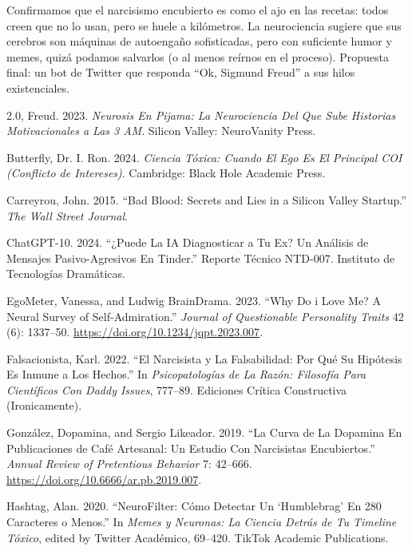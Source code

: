 \documentclass[
]{article}
\newlength{\cslhangindent}
\newenvironment{CSLReferences}[2] %
 {\begin{list}{}{%
  \setlength{\itemindent}{0pt}
  \setlength{\leftmargin}{0pt}
  \setlength{\parsep}{0pt}
  \ifodd #1
   \setlength{\leftmargin}{\cslhangindent}
   \setlength{\itemindent}{-1\cslhangindent}
  \fi
  \setlength{\itemsep}{#2\baselineskip}}}
 {\end{list}}
\begin{document}
Confirmamos que el narcisismo encubierto es como el ajo en las recetas:
todos creen que no lo usan, pero se huele a kilómetros. La neurociencia
sugiere que sus cerebros son máquinas de autoengaño sofisticadas, pero
con suficiente humor y memes, quizá podamos salvarlos (o al menos
reírnos en el proceso). Propuesta final: un bot de Twitter que responda
``Ok, Sigmund Freud'' a sus hilos existenciales.

\label{refs}
\begin{CSLReferences}{1}{0}
2.0, Freud. 2023. \emph{Neurosis En Pijama: La Neurociencia Del Que Sube
Historias Motivacionales a Las 3 AM}. Silicon Valley: NeuroVanity Press.

Butterfly, Dr. I. Ron. 2024. \emph{Ciencia Tóxica: Cuando El Ego Es El
Principal {COI} (Conflicto de Intereses)}. Cambridge: Black Hole
Academic Press.

Carreyrou, John. 2015. {``Bad Blood: Secrets and Lies in a Silicon
Valley Startup.''} \emph{The Wall Street Journal}.

ChatGPT-10. 2024. {``¿Puede La {IA} Diagnosticar a Tu Ex? Un Análisis de
Mensajes Pasivo-Agresivos En Tinder.''} Reporte Técnico NTD-007.
Instituto de Tecnologías Dramáticas.

EgoMeter, Vanessa, and Ludwig BrainDrama. 2023. {``Why Do i Love Me? A
Neural Survey of Self-Admiration.''} \emph{Journal of Questionable
Personality Traits} 42 (6): 1337--50.
\url{https://doi.org/10.1234/jqpt.2023.007}.

Falsacionista, Karl. 2022. {``El Narcisista y La Falsabilidad: Por Qué
Su Hipótesis Es Inmune a Los Hechos.''} In \emph{Psicopatologías de La
Razón: Filosofía Para Científicos Con Daddy Issues}, 777--89. Ediciones
Crítica Constructiva (Ironicamente).

González, Dopamina, and Sergio Likeador. 2019. {``La Curva de La
Dopamina En Publicaciones de Café Artesanal: Un Estudio Con Narcisistas
Encubiertos.''} \emph{Annual Review of Pretentious Behavior} 7: 42--666.
\url{https://doi.org/10.6666/ar.pb.2019.007}.

Hashtag, Alan. 2020. {``NeuroFilter: Cómo Detectar Un {{`Humblebrag'}}
En 280 Caracteres o Menos.''} In \emph{Memes y Neuronas: La Ciencia
Detrás de Tu Timeline Tóxico}, edited by Twitter Académico, 69--420.
TikTok Academic Publications.


\end{CSLReferences}
\end{document}
